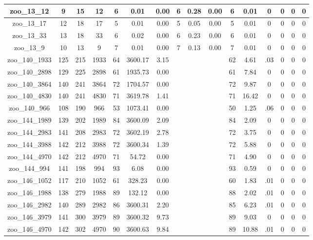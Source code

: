 \begin{landscape}
\begin{longtable}{|c|c|c|c|c|c|c|c|c|c|c|c|c|c|c|c|}
zoo\_13\_12 & 9 & 15 & 12 & 6 & 0.01 & 0.00 & 6 & 0.28 & 0.00 & 6 & 0.01 & 0 & 0 & 0 & 0 \\ \hline 
zoo\_13\_17 & 12 & 18 & 17 & 5 & 0.01 & 0.00 & 5 & 0.05 & 0.00 & 5 & 0.01 & 0 & 0 & 0 & 0 \\ \hline 
zoo\_13\_33 & 13 & 18 & 33 & 6 & 0.02 & 0.00 & 6 & 0.23 & 0.00 & 6 & 0.01 & 0 & 0 & 0 & 0 \\ \hline 
zoo\_13\_9 & 10 & 13 & 9 & 7 & 0.01 & 0.00 & 7 & 0.13 & 0.00 & 7 & 0.01 & 0 & 0 & 0 & 0 \\ \hline 
zoo\_140\_1933 & 125 & 215 & 1933 & 64 & 3600.17 & 3.15 &  &  &  & 62 & 4.61 & .03 & 0 & 0 & 0 \\ \hline 
zoo\_140\_2898 & 129 & 225 & 2898 & 61 & 1935.73 & 0.00 &  &  &  & 61 & 7.84 & 0 & 0 & 0 & 0 \\ \hline 
zoo\_140\_3864 & 140 & 241 & 3864 & 72 & 1704.57 & 0.00 &  &  &  & 72 & 9.87 & 0 & 0 & 0 & 0 \\ \hline 
zoo\_140\_4830 & 140 & 241 & 4830 & 71 & 3619.78 & 1.41 &  &  &  & 71 & 16.42 & 0 & 0 & 0 & 0 \\ \hline 
zoo\_140\_966 & 108 & 190 & 966 & 53 & 1073.41 & 0.00 &  &  &  & 50 & 1.25 & .06 & 0 & 0 & 0 \\ \hline 
zoo\_144\_1989 & 139 & 202 & 1989 & 84 & 3600.09 & 2.09 &  &  &  & 84 & 2.09 & 0 & 0 & 0 & 0 \\ \hline 
zoo\_144\_2983 & 141 & 208 & 2983 & 72 & 3602.19 & 2.78 &  &  &  & 72 & 3.75 & 0 & 0 & 0 & 0 \\ \hline 
zoo\_144\_3988 & 142 & 212 & 3988 & 72 & 3600.34 & 1.39 &  &  &  & 72 & 5.88 & 0 & 0 & 0 & 0 \\ \hline 
zoo\_144\_4970 & 142 & 212 & 4970 & 71 & 54.72 & 0.00 &  &  &  & 71 & 4.90 & 0 & 0 & 0 & 0 \\ \hline 
zoo\_144\_994 & 141 & 198 & 994 & 93 & 6.08 & 0.00 &  &  &  & 93 & 0.59 & 0 & 0 & 0 & 0 \\ \hline 
zoo\_146\_1052 & 117 & 210 & 1052 & 61 & 328.23 & 0.00 &  &  &  & 60 & 1.83 & .01 & 0 & 0 & 0 \\ \hline 
zoo\_146\_1988 & 138 & 279 & 1988 & 89 & 132.12 & 0.00 &  &  &  & 88 & 2.02 & .01 & 0 & 0 & 0 \\ \hline 
zoo\_146\_2982 & 140 & 289 & 2982 & 86 & 3600.31 & 2.20 &  &  &  & 85 & 6.23 & .01 & 0 & 0 & 0 \\ \hline 
zoo\_146\_3979 & 141 & 300 & 3979 & 89 & 3600.32 & 9.73 &  &  &  & 89 & 9.03 & 0 & 0 & 0 & 0 \\ \hline 
zoo\_146\_4970 & 142 & 302 & 4970 & 90 & 3600.63 & 9.84 &  &  &  & 89 & 10.88 & .01 & 0 & 0 & 0 \\ \hline 

\end{longtable}
\end{landscape}
